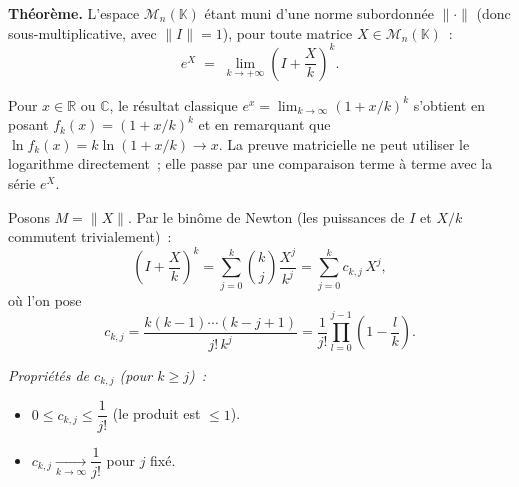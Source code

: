 ﻿%



\begin{tcolorbox}[thmbox]
  \textbf{Théorème.}\enspace%
  L'espace $\mathcal{M}_n(\mathbb{K})$ étant muni d'une norme subordonnée
  $\|\cdot\|$ (donc sous-multiplicative, avec $\|I\| = 1$), pour toute
  matrice $X \in \mathcal{M}_n(\mathbb{K})$~:
  \[
    e^X \;=\; \lim_{k \to +\infty} \left(I + \frac{X}{k}\right)^{\!k}.
  \]
\end{tcolorbox}

Pour $x \in \mathbb{R}$ ou $\mathbb{C}$, le résultat classique
$e^x = \lim_{k\to\infty}{(1+x/k)}^k$ s'obtient en posant
$f_k(x) = {(1+x/k)}^k$ et en remarquant que
$\ln f_k(x) = k\ln(1+x/k) \to x$.
La preuve matricielle ne peut utiliser le logarithme directement~;
elle passe par une comparaison terme à terme avec la série $e^X$.

\decsep{}



\begin{mdframed}[style=proofbar]
  Posons $M = \|X\|$. Par le binôme de Newton (les puissances de $I$ et $X/k$
  commutent trivialement)~:
  \[
    \left(I + \frac{X}{k}\right)^{\!k}
    = \sum_{j=0}^{k} \binom{k}{j}\frac{X^j}{k^j}
    = \sum_{j=0}^{k} c_{k,j}\,X^j,
  \]
  où l'on pose
  \[
    c_{k,j}
    = \frac{k(k-1)\cdots(k-j+1)}{j!\,k^j}
    = \frac{1}{j!}\prod_{l=0}^{j-1}\!\left(1-\frac{l}{k}\right).
  \]

  \textit{Propriétés de $c_{k,j}$ (pour $k \geq j$)~:}
  \begin{itemize}
    \item $0 \leq c_{k,j} \leq \dfrac{1}{j!}$ \quad (le produit est $\leq 1$).
    \item $c_{k,j} \xrightarrow[k\to\infty]{} \dfrac{1}{j!}$ pour $j$ fixé.
  \end{itemize}
\end{mdframed}

